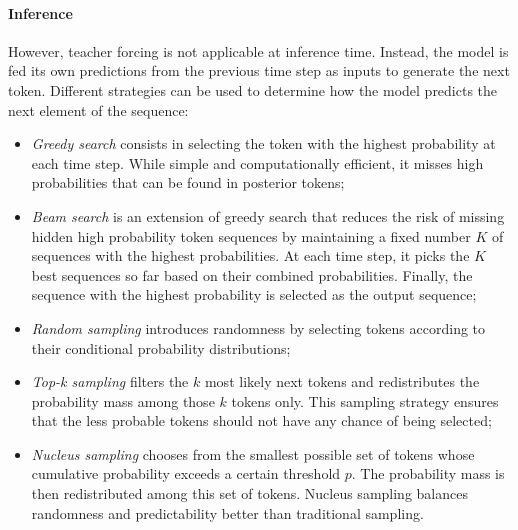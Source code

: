 \paragraph{Inference} However, teacher forcing is not applicable at inference time. Instead, the model is fed its own predictions from the previous time step as inputs to generate the next token. Different strategies can be used to determine how the model predicts the next element of the sequence:

\begin{itemize}
    \item \textit{Greedy search} consists in selecting the token with the highest probability at each time step. While simple and computationally efficient, it misses high probabilities that can be found in posterior tokens;
    \item \textit{Beam search} is an extension of greedy search that reduces the risk of missing hidden high probability token sequences by maintaining a fixed number $K$ of sequences with the highest probabilities. At each time step, it picks the $K$ best sequences so far based on their combined probabilities. Finally, the sequence with the highest probability is selected as the output sequence;
    \item \textit{Random sampling} introduces randomness by selecting tokens according to their conditional probability distributions;
    \item \textit{Top-k sampling} \citep{fan2018hierarchical} filters the $k$ most likely next tokens and redistributes the probability mass among those $k$ tokens only. This sampling strategy ensures that the less probable tokens should not have any chance of being selected;
    \item \textit{Nucleus sampling} chooses from the smallest possible set of tokens whose cumulative probability exceeds a certain threshold $p$. The probability mass is then redistributed among this set of tokens. Nucleus sampling balances randomness and predictability better than traditional sampling.
\end{itemize}




